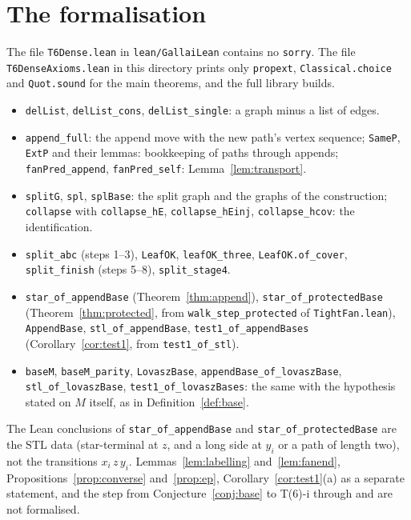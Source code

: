\documentclass[11pt]{amsart}
\theoremstyle{definition}
\newcommand{\STL}{\mathrm{STL}}
\begin{document}
\section{The formalisation}\label{sec:lean}
\sloppy
The file \texttt{T6Dense.lean} in \texttt{lean/GallaiLean} contains no \texttt{sorry}. The
file \texttt{T6DenseAxioms.lean} in this directory prints only \texttt{propext},
\texttt{Classical.choice} and \texttt{Quot.sound} for the main theorems, and the full library
builds.
\begin{itemize}
\item \texttt{delList}, \texttt{delList\_cons}, \texttt{delList\_single}: a graph minus a list of
edges.
\item \texttt{append\_full}: the append move with the new path's vertex sequence;
\texttt{SameP}, \texttt{ExtP} and their lemmas: bookkeeping of paths through appends;
\texttt{fanPred\_append}, \texttt{fanPred\_self}: Lemma~\ref{lem:transport}.
\item \texttt{splitG}, \texttt{spl}, \texttt{splBase}: the split graph and the graphs of the
construction; \texttt{collapse} with \texttt{collapse\_hE}, \texttt{collapse\_hEinj},
\texttt{collapse\_hcov}: the identification.
\item \texttt{split\_abc} (steps 1--3), \texttt{LeafOK}, \texttt{leafOK\_three},
\texttt{LeafOK.of\_cover}, \texttt{split\_finish} (steps 5--8), \texttt{split\_stage4}.
\item \texttt{star\_of\_appendBase} (Theorem~\ref{thm:append}), \texttt{star\_of\_protectedBase}
(Theorem~\ref{thm:protected}, from \texttt{walk\_step\_protected} of \texttt{TightFan.lean}),
\texttt{AppendBase}, \texttt{stl\_of\_appendBase}, \texttt{test1\_of\_appendBases}
(Corollary~\ref{cor:test1}, from \texttt{test1\_of\_stl}).
\item \texttt{baseM}, \texttt{baseM\_parity}, \texttt{LovaszBase},
\texttt{appendBase\_of\_lovaszBase}, \texttt{stl\_of\_lovaszBase},
\texttt{test1\_of\_lovaszBases}: the same with the hypothesis stated on $M$ itself, as in
Definition~\ref{def:base}.
\end{itemize}
The Lean conclusions of \texttt{star\_of\_appendBase} and \texttt{star\_of\_protectedBase} are
the $\STL$ data (star-terminal at $z$, and a long side at $y_i$ or a path of length two), not the
transitions $x_i\,z\,y_i$. Lemmas~\ref{lem:labelling} and~\ref{lem:fanend},
Propositions~\ref{prop:converse} and~\ref{prop:ep}, Corollary~\ref{cor:test1}(a) as a separate
statement, and the step from Conjecture~\ref{conj:base} to T(6)-i through \cite{RS} and
\cite[Thm~144]{MR} are not formalised.
\end{document}
